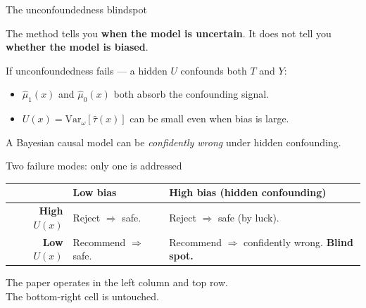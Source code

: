 \documentclass[aspectratio=169]{beamer}
\begin{document}
\begin{frame}{The unconfoundedness blindspot}

The method tells you \textbf{when the model is uncertain}.
It does not tell you \textbf{whether the model is biased}.

\bigskip
If unconfoundedness fails --- a hidden $U$ confounds both $T$ and $Y$:

\begin{center}
\end{center}

\begin{itemize}
  \item $\hat\mu_1(x)$ and $\hat\mu_0(x)$ both absorb the confounding signal.
  \item \alert{$U(x) = \mathrm{Var}_\omega[\hat\tau(x)]$ can be small even when bias is large.}
\end{itemize}

\begin{block}{}
A Bayesian causal model can be \emph{confidently wrong} under hidden confounding.
\end{block}
\end{frame}

\begin{frame}{Two failure modes: only one is addressed}

\begin{center}
\renewcommand{\arraystretch}{1.8}
\begin{tabular}{r|p{4.6cm}p{4.6cm}}
 & \textbf{Low bias} & \textbf{High bias (hidden confounding)} \\
\hline
\textbf{High $U(x)$}
  & \textcolor{green!60!black}{Reject $\Rightarrow$ safe.}
  & \textcolor{green!60!black}{Reject $\Rightarrow$ safe (by luck).} \\
\hline
\textbf{Low $U(x)$}
  & \textcolor{green!60!black}{Recommend $\Rightarrow$ safe.}
  & \alert{Recommend $\Rightarrow$ confidently wrong.}
    \textbf{Blind spot.} \\
\end{tabular}
\end{center}

\bigskip
The paper operates in the left column and top row.\\
The bottom-right cell is untouched.
\end{frame}
\end{document}
